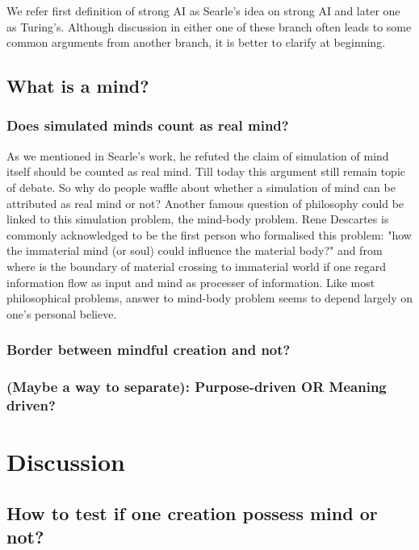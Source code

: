 \documentclass[11pt]{article}
\begin{document}
We refer first definition of strong AI as Searle's idea on strong AI and later one as Turing's. Although discussion in either one of these branch often leads to some common arguments from another branch, it is better to clarify at beginning. 

\subsection{What is a mind?}

\subsubsection{Does simulated minds count as real mind?}

As we mentioned in Searle's work, he refuted the claim of simulation of mind itself should be counted as real mind. Till today this argument still remain topic of debate.  So why do people waffle about whether a simulation of mind can be attributed as real mind or not? Another famous question of philosophy could be linked to this simulation problem, the mind-body problem. Rene Descartes is commonly acknowledged to be the first person who formalised this problem: "how the immaterial mind (or soul) could influence the material body?" and from where is the boundary of material crossing to immaterial world if one regard information flow as input and mind as processer of information. Like most philosophical problems, answer to mind-body problem seems to depend largely on one's personal believe.

\subsubsection{Border between mindful creation and not?}

\subsubsection{(Maybe a way to separate): Purpose-driven OR Meaning driven?}


\section{Discussion}
\label{sec:discussion}

\subsection{How to test if one creation possess mind or not?}
\end{document}
